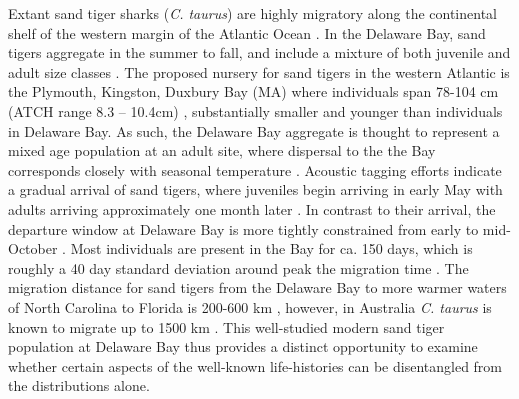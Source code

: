 \documentclass[]{rsos}%
\begin{document}
Extant sand tiger sharks (\emph{C. taurus}) are highly migratory along the continental shelf of the western margin of the Atlantic Ocean \cite{haulsee2018spatial, Teter2015, Kneebone2012, kneebone2014movement}.
In the Delaware Bay, sand tigers aggregate in the summer to fall, and include a mixture of both juvenile and adult size classes \cite{Teter2015, haulsee2018spatial}. %
The proposed nursery for sand tigers in the western Atlantic is the Plymouth, Kingston, Duxbury Bay (MA) where individuals span 78-104 cm (ATCH range 8.3 – 10.4cm) \cite{Kneebone2012}, substantially smaller and younger than individuals in Delaware Bay.
As such, the Delaware Bay aggregate is thought to represent a mixed age population at an adult site, where dispersal to the the Bay corresponds closely with seasonal temperature \cite{Teter2015}.
Acoustic tagging efforts indicate a gradual arrival of sand tigers, where juveniles begin arriving in early May with adults arriving approximately one month later \cite{haulsee2018spatial}. 
In contrast to their arrival, the departure window at Delaware Bay is more tightly constrained from early to mid-October \cite{Teter2015, haulsee2018spatial}.
Most individuals are present in the Bay for ca. 150 days, which is roughly a 40 day standard deviation around peak the migration time \cite{haulsee2018spatial}. 
The migration distance for sand tigers from the Delaware Bay to more warmer waters of North Carolina to Florida is 200-600 km \cite{Teter2015}, however, in Australia \emph{C. taurus} is known to migrate up to 1500 km \cite{otway2011pop}.
This well-studied modern sand tiger population at Delaware Bay thus provides a distinct opportunity to examine whether certain aspects of the well-known life-histories can be disentangled from the distributions alone.
 
\end{document}
